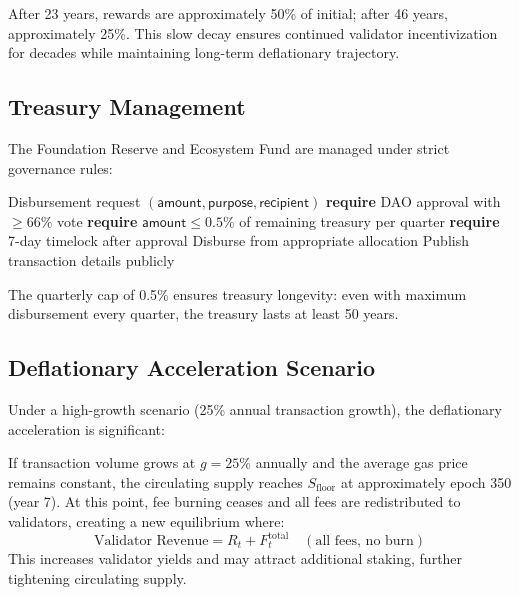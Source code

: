 After 23 years, rewards are approximately 50\% of initial; after 46 years, approximately 25\%. This slow decay ensures continued validator incentivization for decades while maintaining long-term deflationary trajectory.

\subsection{Treasury Management}

The Foundation Reserve and Ecosystem Fund are managed under strict governance rules:

\begin{algorithm}[H]
\caption{Treasury Disbursement Protocol}
\label{alg:treasury}
\begin{algorithmic}[1]
\Require Disbursement request $(\mathsf{amount}, \mathsf{purpose}, \mathsf{recipient})$
\State \textbf{require} DAO approval with $\geq 66\%$ vote
\State \textbf{require} $\mathsf{amount} \leq 0.5\%$ of remaining treasury per quarter
\State \textbf{require} 7-day timelock after approval
\State Disburse from appropriate allocation
\State Publish transaction details publicly
\end{algorithmic}
\end{algorithm}

The quarterly cap of 0.5\% ensures treasury longevity: even with maximum disbursement every quarter, the treasury lasts at least 50 years.

\subsection{Deflationary Acceleration Scenario}

Under a high-growth scenario (25\% annual transaction growth), the deflationary acceleration is significant:

\begin{proposition}
If transaction volume grows at $g = 25\%$ annually and the average gas price remains constant, the circulating supply reaches $S_{\text{floor}}$ at approximately epoch 350 (year 7). At this point, fee burning ceases and all fees are redistributed to validators, creating a new equilibrium where:
\begin{equation}
    \text{Validator Revenue} = R_t + F_t^{\text{total}} \quad (\text{all fees, no burn})
\end{equation}
This increases validator yields and may attract additional staking, further tightening circulating supply.
\end{proposition}


